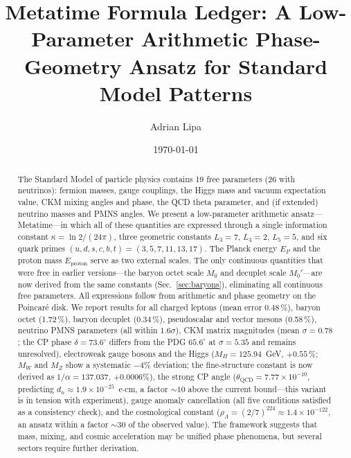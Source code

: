 \documentclass[aps,prd,reprint,twocolumn,showpacs,superscriptaddress]{revtex4-2}
\begin{document}
\title{Metatime Formula Ledger: A Low-Parameter Arithmetic Phase-Geometry Ansatz for Standard Model Patterns}

\author{Adrian Lipa}

\date{\today}

\begin{abstract}
The Standard Model of particle physics contains 19 free parameters (26 with neutrinos):
fermion masses, gauge couplings, the Higgs mass and vacuum expectation value,
CKM mixing angles and phase, the QCD theta parameter, and (if extended) neutrino
masses and PMNS angles.  We present a low-parameter arithmetic ansatz---Metatime---in which all of these
quantities are expressed through a single information constant $\kappa = \ln 2/(24\pi)$,
three geometric constants $L_3 = 7$, $L_4 = 2$, $L_5 = 5$, and six quark primes
$(u,d,s,c,b,t) = (3,5,7,11,13,17)$.  The Planck energy $E_P$ and the proton mass
$E_{\text{proton}}$ serve as two external scales.  The only continuous quantities
that were free in earlier versions---the baryon octet scale $M_0$ and decuplet
scale $M_0'$---are now derived from the same constants (Sec.~\ref{sec:baryons}),
eliminating all continuous free parameters.  All expressions follow from arithmetic
and phase geometry on the Poincar\'{e} disk.  We report results for all charged leptons (mean error
0.48\,\%), baryon octet (1.72\,\%), baryon decuplet (0.34\,\%), pseudoscalar and
vector mesons (0.58\,\%), neutrino PMNS parameters (all within $1.6\sigma$),
CKM matrix magnitudes (mean $\sigma = 0.78$; the CP phase $\delta = 73.6^\circ$
differs from the PDG $65.6^\circ$ at $\sigma = 5.35$ and remains unresolved),
electroweak gauge bosons and the Higgs
($M_H = 125.94$~GeV, $+0.55\,\%$; $M_W$ and $M_Z$ show a systematic $-4\%$
deviation; the fine-structure constant is now derived as
$1/\alpha = 137.037$, $+0.0006\%$), the strong CP angle
($\theta_{\text{QCD}} = 7.77 \times 10^{-10}$, predicting $d_n \approx
1.9 \times 10^{-25}$~e$\cdot$cm, a factor $\sim 10$ above the current
bound---this variant is in tension with experiment),
gauge anomaly cancellation
(all five conditions satisfied as a consistency check), and the cosmological constant
($\rho_\Lambda = (2/7)^{224} \approx 1.4 \times 10^{-122}$, an ansatz
within a factor $\sim 30$ of the observed value).
The framework suggests that mass, mixing, and cosmic acceleration may be unified
phase phenomena, but several sectors require further derivation.
\end{abstract}
\end{document}
